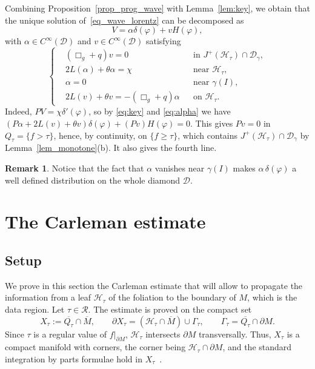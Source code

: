 \documentclass[12pt,reqno]{amsart}
\numberwithin{equation}{section}
\theoremstyle{definition}
\theoremstyle{plain}
\theoremstyle{definition}
\theoremstyle{definition}
\newtheorem{remark}[theorem]{Remark}
\newcommand{\D}{\mathcal{D}}
\newcommand{\Ht}{\mathcal{H}_{\tau}}
\newcommand{\dg}{\D_\gamma}
\newcommand{\uu}{M}
\begin{document}
Combining Proposition~\ref{prop_prog_wave} with Lemma~\ref{lem:key}, we obtain that the unique solution of~\eqref{eq_wave_lorentz} can be decomposed as
\begin{equation}
    V=\alpha \delta(\varphi) + v H(\varphi),
\end{equation}
with $\alpha \in C^\infty(\D)$ and $v \in C^\infty(\D)$ satisfying
\begin{equation}
\label{system_a_v}
\left\{
\begin{aligned}
&(\Box_g + q)v = 0
&& \text{in } J^+(\mathcal{H}_\tau)\cap\dg, \\[0.6em]
&2L(\alpha) + \theta \alpha = \chi
&& \text{near } \mathcal{H}_\tau, \\[0.6em]
&\alpha=0 && \text{near } \gamma(I), \\[0.6em]
&2L(v) + \theta v
= -(\Box_g + q)\alpha
&& \text{on } \mathcal{H}_\tau.
\end{aligned}
\right.
\end{equation}
Indeed, $PV=\chi\delta'(\varphi)$, so by \eqref{eq:key} and \eqref{eq:alpha} we have $(P\alpha+2L(v)+\theta v)\delta(\varphi)+(Pv)H(\varphi)=0$. This gives $Pv=0$ in $Q_\tau=\{f>\tau\}$, hence, by continuity, on $\{f\ge\tau\}$, which contains $J^+(\Ht)\cap\dg$ by Lemma~\ref{lem_monotone}(b). It also gives the fourth line.

\begin{remark}
    Notice that the fact that $\alpha$ vanishes near $\gamma(I)$ makes $\alpha\,\delta(\varphi)$ a well defined distribution on the whole diamond $\D$.
\end{remark}





\section{The Carleman estimate}\label{sec_carleman}

\subsection{Setup}\label{sec_setup}

We prove in this section the Carleman estimate that will allow to propagate the information from a leaf $\mathcal H_\tau$ of the foliation to the boundary of $M$, which is the data region. Let $\tau\in\mathcal R$. The estimate is proved on the compact set
\[
X_\tau:=\overline{Q_\tau}\cap\overline\uu,\qquad \partial X_\tau=(\mathcal H_\tau\cap\overline\uu)\cup\Gamma_\tau,\qquad \Gamma_\tau=\overline{Q_\tau}\cap\partial\uu .
\]
Since $\tau$ is a regular value of $f|_{\partial\uu}$, $\mathcal H_\tau$ intersects $\partial \uu$ transversally. Thus, $X_\tau$ is a compact manifold with corners, the corner being $\mathcal H_\tau\cap\partial\uu$, and the standard integration by parts formulae hold in $X_\tau$~\cite{lee2002}.
\end{document}
